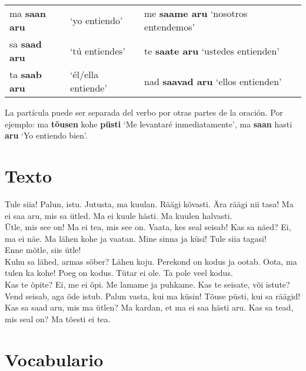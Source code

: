 \begin{center}
\begin{tabular}{ l l l l }
	ma \textbf{saan aru} & `yo entiendo' 		& me \textbf{saame aru} `nosotros entendemos' \\
	sa \textbf{saad aru} & `tú entiendes'		& te \textbf{saate aru}	`ustedes entienden' \\
	ta \textbf{saab aru} & `él/ella entiende' 	& nad \textbf{saavad aru} `ellos entienden'
\end{tabular}	
\end{center}
\bigskip

La partícula puede ser separada del verbo por otras partes de la oración. Por ejemplo: ma \textbf{tõusen} kohe \textbf{püsti} `Me levantaré inmediatamente', ma \textbf{saan} hasti \textbf{aru} `Yo entiendo bien'.


\Large{\section*{Texto}}

Tule siia! Palun, istu. Jutusta, ma kuulan. Räägi kõvasti. Ära räägi nii tasa! Ma ei saa aru, mis sa ütled. Ma ei kuule hästi. Ma kuulen halvasti.\\
Ütle, mis see on! Ma ei tea, mis see on. Vaata, kes seal seisab! Kas sa näed? Ei, ma ei näe. Ma lähen kohe ja vaatan. Mine sinna ja küsi! Tule siia tagasi!\\
Enne mõtle, siis ütle!\\

Kuhu sa lähed, armas sõber? Lähen koju. Perekond on kodus ja ootab. Oota, ma tulen ka kohe! Poeg on kodus. Tütar ei ole. Ta pole veel kodus.\\
Kas te õpite? Ei, me ei õpi. Me lamame ja puhkame. Kas te seisate, või istute? Vend seisab, aga õde istub. Palun vasta, kui ma küsin! Tõuse püsti, kui sa räägid! Kas sa saad aru, mis ma ütlen? Ma kardan, et ma ei saa hästi aru. Kas sa tead, mis seal on? Ma tõesti ei tea.

\Large{\section*{Vocabulario}}

